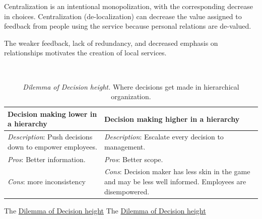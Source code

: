 Centralization is an intentional monopolization, with the corresponding decrease in choices. 
Centralization (de-localization) can decrease the value assigned to feedback from people using the service because personal relations are de-valued. 

The weaker feedback, lack of redundancy, and decreased emphasis on relationships motivates the creation of local services. 

\ \\

\begin{center}
\begin{table}[H] %
\begin{tabular}{ | m{\dilemmatablewidth}| m{\dilemmatablewidth} | } 
  \hline
  \textbf{Decision making lower in a hierarchy} &
  \textbf{Decision making higher in a hierarchy} \\
  \hline
  \textit{Description}: Push decisions down to empower employees. &
  \textit{Description}: Escalate every decision to management. \\  
  \hline
  \textit{Pros}: Better information. &
  \textit{Pros}: Better scope. \\
  \hline
  \textit{Cons}: more inconsistency & 
  \textit{Cons}: Decision maker has less skin in the game and may be less well informed. Employees are disempowered. \\
  \hline
\end{tabular}
\caption{
\textit{Dilemma of Decision height.}
Where decisions get made in hierarchical organization.
}
\label{table:decisions_low-vs-high}
\end{table}
\end{center}


The \href{table:decisions_low-vs-high}{Dilemma of Decision height}
The \href{table:decisions_low-vs-high}{Dilemma of Decision height}


